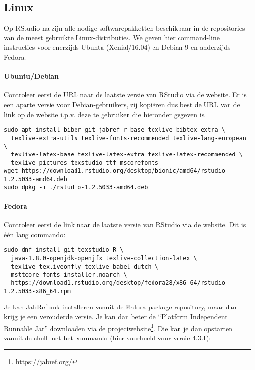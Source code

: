 \subsection{Linux}
\label{ssec:installatie-linux}

Op RStudio na zijn alle nodige softwarepakketten beschikbaar in de repositories van de meest gebruikte Linux-distributies. We geven hier command-line instructies voor enerzijds Ubuntu (Xenial/16.04) en Debian 9 en anderzijds Fedora.

\paragraph{Ubuntu/Debian} 

Controleer eerst de URL naar de laatste versie van RStudio via de website. Er is een aparte versie voor Debian-gebruikers, zij kopi\"eren dus best de URL van de link op de website i.p.v. deze te gebruiken die hieronder gegeven is.

\begin{verbatim}
sudo apt install biber git jabref r-base texlive-bibtex-extra \
  texlive-extra-utils texlive-fonts-recommended texlive-lang-european \
  texlive-latex-base texlive-latex-extra texlive-latex-recommended \
  texlive-pictures texstudio ttf-mscorefonts
wget https://download1.rstudio.org/desktop/bionic/amd64/rstudio-1.2.5033-amd64.deb
sudo dpkg -i ./rstudio-1.2.5033-amd64.deb
\end{verbatim}

\paragraph{Fedora}

Controleer eerst de link naar de laatste versie van RStudio via de website. Dit is één lang commando:

\begin{verbatim}
sudo dnf install git texstudio R \
  java-1.8.0-openjdk-openjfx texlive-collection-latex \
  texlive-texliveonfly texlive-babel-dutch \
  msttcore-fonts-installer.noarch \
  https://download1.rstudio.org/desktop/fedora28/x86_64/rstudio-1.2.5033-x86_64.rpm
\end{verbatim}

Je kan JabRef ook installeren vanuit de Fedora package repository, maar dan krijg je een verouderde versie. Je kan dan beter de ``Platform Independent Runnable Jar'' downloaden via de projectwebsite\footnote{\url{https://jabref.org/}}. Die kan je dan opstarten vanuit de shell met het commando (hier voorbeeld voor versie 4.3.1):

